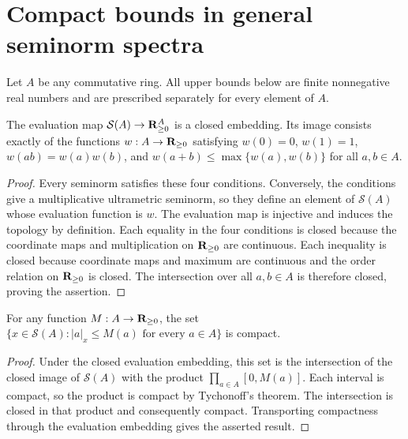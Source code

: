 \section{Compact bounds in general seminorm spectra}\label{sec:general-spectrum-topology}

Let $A$ be any commutative ring. All upper bounds below are finite nonnegative
real numbers and are prescribed separately for every element of $A$.

\begin{lemma}\label{spectrum:closed-evaluation-embedding}
\leanok
{}
The evaluation map $\mathcal S(A)\to\mathbf{R}_{\ge0}^{A}$ is a closed embedding.
Its image consists exactly of the functions $w:A\to\mathbf{R}_{\ge0}$ satisfying
$w(0)=0$, $w(1)=1$, $w(ab)=w(a)w(b)$, and
$w(a+b)\le\max\{w(a),w(b)\}$ for all $a,b\in A$.
\end{lemma}
\begin{proof}
Every seminorm satisfies these four conditions. Conversely, the conditions
give a multiplicative ultrametric seminorm, so they define an element of
$\mathcal S(A)$ whose evaluation function is $w$. The evaluation map is
injective and induces the topology by definition. Each equality in the four
conditions is closed because the coordinate maps and multiplication on
$\mathbf{R}_{\ge0}$ are continuous. Each inequality is closed because coordinate
maps and maximum are continuous and the order relation on $\mathbf{R}_{\ge0}$ is closed.
The intersection over all $a,b\in A$ is therefore closed, proving the assertion.
\end{proof}

\begin{theorem}\label{spectrum:compact-coordinate-bounds}
\leanok
{}
For any function $M:A\to\mathbf{R}_{\ge0}$, the set
$\{x\in\mathcal S(A):|a|_x\le M(a)\text{ for every }a\in A\}$ is compact.
\end{theorem}
\begin{proof}
Under the closed evaluation embedding, this set is the intersection of the
closed image of $\mathcal S(A)$ with the product $\prod_{a\in A}[0,M(a)]$.
Each interval is compact, so the product is compact by Tychonoff's theorem.
The intersection is closed in that product and consequently compact.
Transporting compactness through the evaluation embedding gives the asserted result.
\end{proof}

